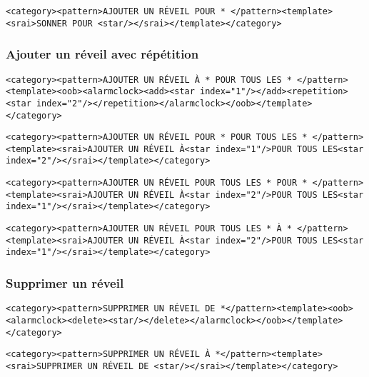 \begin{lstlisting}[frame=none,aboveskip=0.5em]
<category><pattern>AJOUTER UN RÉVEIL POUR * </pattern><template><srai>SONNER POUR <star/></srai></template></category>
\end{lstlisting}

\subsubsection{Ajouter un réveil avec répétition}
\begin{lstlisting}[frame=none,aboveskip=0.5em]
<category><pattern>AJOUTER UN RÉVEIL À * POUR TOUS LES * </pattern><template><oob><alarmclock><add><star index="1"/></add><repetition><star index="2"/></repetition></alarmclock></oob></template></category>
\end{lstlisting}

\begin{lstlisting}[frame=none,aboveskip=0.5em]
<category><pattern>AJOUTER UN RÉVEIL POUR * POUR TOUS LES * </pattern><template><srai>AJOUTER UN RÉVEIL À<star index="1"/>POUR TOUS LES<star index="2"/></srai></template></category>
\end{lstlisting}

\begin{lstlisting}[frame=none,aboveskip=0.5em]
<category><pattern>AJOUTER UN RÉVEIL POUR TOUS LES * POUR * </pattern><template><srai>AJOUTER UN RÉVEIL À<star index="2"/>POUR TOUS LES<star index="1"/></srai></template></category>
\end{lstlisting}

\begin{lstlisting}[frame=none,aboveskip=0.5em]
<category><pattern>AJOUTER UN RÉVEIL POUR TOUS LES * À * </pattern><template><srai>AJOUTER UN RÉVEIL À<star index="2"/>POUR TOUS LES<star index="1"/></srai></template></category>
\end{lstlisting}

\subsubsection{Supprimer un réveil}
\begin{lstlisting}[frame=none,aboveskip=0.5em]
<category><pattern>SUPPRIMER UN RÉVEIL DE *</pattern><template><oob>
<alarmclock><delete><star/></delete></alarmclock></oob></template></category>
\end{lstlisting}

\begin{lstlisting}[frame=none,aboveskip=0.5em]
<category><pattern>SUPPRIMER UN RÉVEIL À *</pattern><template><srai>SUPPRIMER UN RÉVEIL DE <star/></srai></template></category>
\end{lstlisting}

